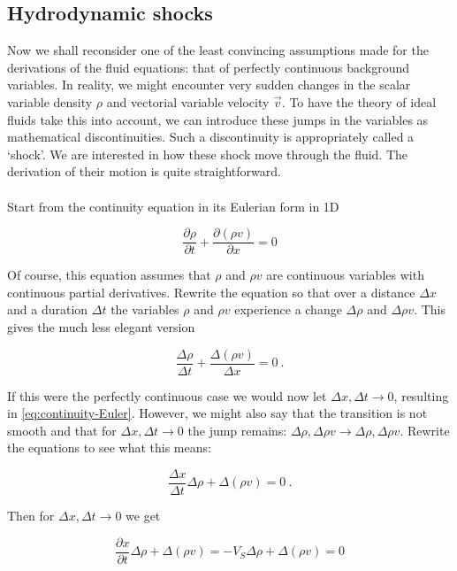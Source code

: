 \subsection{Hydrodynamic shocks}

Now we shall reconsider one of the least convincing assumptions made for the derivations of the fluid equations: that of perfectly continuous background variables. In reality, we might encounter very sudden changes in the scalar variable density $\rho$ and vectorial variable velocity $\vec{v}$. To have the theory of ideal fluids take this into account, we can introduce these jumps in the variables as mathematical discontinuities. Such a discontinuity is appropriately called a `shock'. We are interested in how these shock move through the fluid. The derivation of their motion is quite straightforward.\\
\\
Start from the continuity equation in its Eulerian form in 1D

\begin{equation}
\label{eq:continuity-Euler}
\frac{\partial \rho}{\partial t} + \frac{\partial(\rho v)}{\partial x} = 0
\end{equation}

Of course, this equation assumes that $\rho$ and $\rho v$ are continuous variables with continuous partial derivatives. Rewrite the equation so that over a distance $\Delta x$ and a duration $\Delta t$ the variables $\rho$ and $\rho v$ experience a change $\Delta\rho$ and $\Delta \rho v$. This gives the much less elegant version 

$$ \frac{\Delta \rho}{\Delta t} + \frac{\Delta(\rho v)}{\Delta x} = 0 \ . $$

If this were the perfectly continuous case we would now let $\Delta x, \Delta t \to 0$, resulting in \cref{eq:continuity-Euler}. However, we might also say that the transition is not smooth and that for $\Delta x, \Delta t \to 0$ the jump remains: $ \Delta \rho, \Delta \rho v \to \Delta \rho, \Delta \rho v $. Rewrite the equations to see what this means:

$$ \frac{\Delta x}{\Delta t} \Delta \rho + \Delta(\rho v) = 0 \ . $$

Then for $\Delta x, \Delta t \to 0$ we get 

\begin{equation}
\label{eq:HD-shock-condition}
\frac{\partial x}{\partial t} \Delta \rho + \Delta(\rho v) = -V_S \Delta \rho + \Delta(\rho v) = 0
\end{equation}

